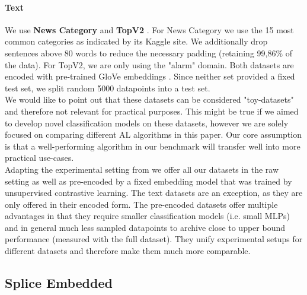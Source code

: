 \documentclass[]{article}
\begin{document}
\paragraph{Text}
We use \textbf{News Category} \cite{misra2022news} and \textbf{TopV2} \cite{chen-etal-2020-low-resource}.
For News Category we use  the 15 most common categories as indicated by its Kaggle site.
We additionally drop sentences above 80 words to reduce the necessary padding (retaining 99,86\% of the data).
For TopV2, we are only using the "alarm" domain.
Both datasets are encoded with pre-trained GloVe embeddings \cite{pennington2014glove}.
Since neither set provided a fixed test set, we split random 5000 datapoints into a test set. \\ [3mm]
%
We would like to point out that these datasets can be considered "toy-datasets" and therefore not relevant for practical purposes.
This might be true if we aimed to develop novel classification models on these datasets, however we are solely focused on comparing different AL algorithms in this paper.
Our core assumption is that a well-performing algorithm in our benchmark will transfer well into more practical use-cases. \\ [1mm]
Adapting the experimental setting from \cite{hacohen2022active} we offer all our datasets in the raw setting as well as pre-encoded by a fixed embedding model that was trained by unsupervised contrastive learning. 
The text datasets are an exception, as they are only offered in their encoded form.
The pre-encoded datasets offer multiple advantages in that they require smaller classification models (i.e. small MLPs) and in general much less sampled datapoints to archive close to upper bound performance (measured with the full dataset).
They unify experimental setups for different datasets and therefore make them much more comparable.

\subsection{Splice Embedded}
\end{document}
